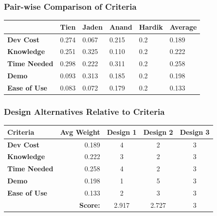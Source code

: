 \documentclass[12pt]{article}
\newcommand\cellhead[1]{\cellcolor{lightgray}\textbf{ #1 }}
\begin{document}
            \subsubsection{Pair-wise Comparison of Criteria}
                \begin{center}\begin{tabular}{|l|l|l|l|l|l|}
                    \hline
                    & \cellhead{Tien} & \cellhead{Jaden} & \cellhead{Anand} & \cellhead{Hardik} & \cellhead{Average} \\\hline
                    \cellhead{Dev Cost} & 0.274 & 0.067 & 0.215 & 0.2 & 0.189 \\\hline
                    \cellhead{Knowledge} & 0.251 & 0.325 & 0.110 & 0.2 & 0.222 \\\hline
                    \cellhead{Time Needed} & 0.298 & 0.222 & 0.311 & 0.2 & 0.258 \\\hline
                    \cellhead{Demo} & 0.093 & 0.313 & 0.185 & 0.2 & 0.198 \\\hline
                    \cellhead{Ease of Use} & 0.083 & 0.072 & 0.179 & 0.2 & 0.133 \\\hline
                \end{tabular}\end{center}
            
            \subsubsection{Design Alternatives Relative to Criteria}
                \begin{center}\begin{tabular}{|l|r|c|c|c|}
                    \hline
                    \cellhead{Criteria} & \cellhead{Avg Weight} & \cellhead{Design 1} & \cellhead{Design 2} & \cellhead{Design 3} \\\hline
                    \cellhead{Dev Cost} & 0.189 & 4 & 2 & 3 \\\hline
                    \cellhead{Knowledge} & 0.222 & 3 & 2 & 3 \\\hline
                    \cellhead{Time Needed} & 0.258 & 4 & 2 & 3 \\\hline
                    \cellhead{Demo} & 0.198 & 1 & 5 & 3 \\\hline
                    \cellhead{Ease of Use} & 0.133 & 2 & 3 & 3 \\\hline      
                     & \cellhead{Score:} & 2.917 & 2.727 & 3 \\\hline
                \end{tabular}\end{center}
\end{document}
